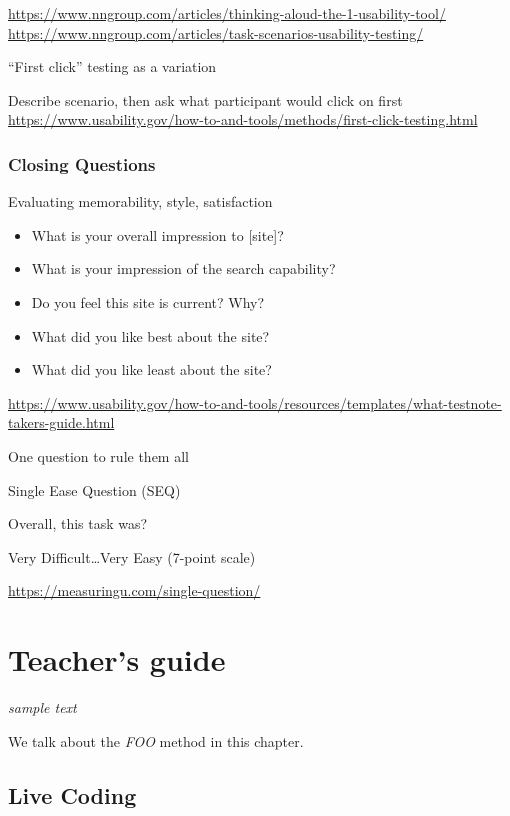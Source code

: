 \documentclass[
]{krantz}
\providecommand{\tightlist}{%
  \setlength{\itemsep}{0pt}\setlength{\parskip}{0pt}}
\begin{document}
\url{https://www.nngroup.com/articles/thinking-aloud-the-1-usability-tool/}
\url{https://www.nngroup.com/articles/task-scenarios-usability-testing/}

``First click'' testing as a variation

Describe scenario, then ask what participant would click on first
\url{https://www.usability.gov/how-to-and-tools/methods/first-click-testing.html}

\hypertarget{closing-questions}{%
\subsection{Closing Questions}\label{closing-questions}}

Evaluating memorability, style, satisfaction

\begin{itemize}
\tightlist
\item
  What is your overall impression to {[}site{]}?
\item
  What is your impression of the search capability?
\item
  Do you feel this site is current? Why?
\item
  What did you like best about the site?
\item
  What did you like least about the site?
\end{itemize}

\url{https://www.usability.gov/how-to-and-tools/resources/templates/what-testnote-takers-guide.html}

One question to rule them all

Single Ease Question (SEQ)

Overall, this task was?

Very Difficult\ldots Very Easy
(7-point scale)

\url{https://measuringu.com/single-question/}

\hypertarget{teachers-guide}{%
\chapter{Teacher's guide}\label{teachers-guide}}

\emph{sample text}

We talk about the \emph{FOO} method in this chapter.

\hypertarget{live-coding}{%
\section{Live Coding}\label{live-coding}}
\end{document}
